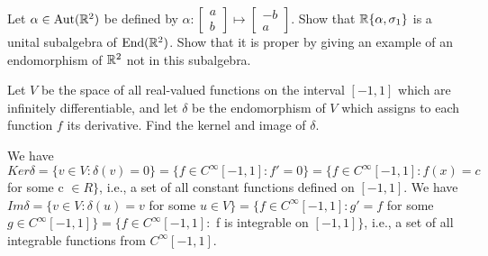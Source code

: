 \probskip

\begin{problem}[Golan 325]
Let $\alpha \in \operatorname{Aut}(\mathbb{R}^2)$ be defined by 
$\alpha: 
\begin{bmatrix} a\\ b \end{bmatrix} 
\mapsto 
\begin{bmatrix} -b\\ a \end{bmatrix}$.
Show that $\mathbb{R}\{\alpha, \sigma_1\}$ is a unital subalgebra of $\operatorname{End}(\mathbb{R}^2)$.  Show
that it is proper by giving an example of an endomorphism of $\mathbb{R}^2$ not in this
subalgebra. 
\end{problem}

\probskip

\begin{problem}[Golan 326]
Let $V$ be the space of all real-valued functions on the interval $[-1, 1]$
which are infinitely differentiable, and let $\delta$ be the endomorphism of $V$
which assigns to each function $f$ its derivative.  Find the kernel and image of
$\delta$. 
\end{problem}
\smallskip
\begin{solution}

We have $Ker\delta=\{v \in V : \delta(v)=0 \} = \{f \in C^{\infty}[-1,1] : f'=0 \} = 
\{f \in C^{\infty}[-1,1] : f(x) = c$ for some c $\in R\}$, i.e., a set of all constant 
functions defined on $[-1,1]$.
\smallskip
We have $Im\delta=\{v \in V : \delta(u)=v$ for some $u \in V \} = 
\{f \in C^{\infty}[-1,1] : g'=f$ for some $g \in C^{\infty}[-1,1] \} = 
\{f \in C^{\infty}[-1,1] : $ f is integrable on $[-1,1] \}$, i.e., a set of all 
integrable functions from $C^{\infty}[-1,1]$.

\end{solution}

\probskip

